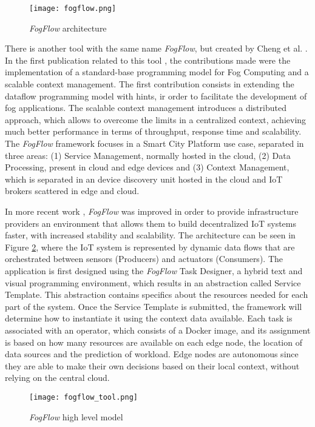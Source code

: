 \begin{figure}[h]
\caption{\textit{FogFlow} architecture \cite{fog_flow}}
\label{fig:fogflow}
\centering
\texttt{[image: fogflow.png]}
\end{figure}

There is another tool with the same name \textit{FogFlow}, but created by Cheng et al. \cite{fogflow_github}. In the first publication related to this tool \cite{fog_flow_easy}, the contributions made were the implementation of a standard-base programming model for Fog Computing and a scalable context management. The first contribution consists in extending the dataflow programming model with hints, ir order to facilitate the development of fog applications. The scalable context management introduces a distributed approach, which allows to overcome the limits in a centralized context, achieving much better performance in terms of throughput, response time and scalability. The \textit{FogFlow} framework focuses in a Smart City Platform use case, separated in three areas: (1) Service Management, normally hosted in the cloud, (2) Data Processing, present in cloud and edge devices and (3) Context Management, which is separated in an device discovery unit hosted in the cloud and IoT brokers scattered in edge and cloud.

In more recent work \cite{fog_flow_tool}, \textit{FogFlow} was improved in order to provide infrastructure providers an environment that allows them to build decentralized IoT systems faster, with increased stability and scalability. The architecture can be seen in Figure \ref{fig:fogflow_tool}, where the IoT system is represented by dynamic data flows that are orchestrated between sensors (Producers) and actuators (Consumers). The application is first designed using the \textit{FogFlow} Task Designer, a hybrid text and visual programming environment, which results in an abstraction called Service Template. This abstraction contains specifics about the resources needed for each part of the system. Once the Service Template is submitted, the framework will determine how to instantiate it using the context data available. Each task is associated with an operator, which consists of a Docker image, and its assignment is based on how many resources are available on each edge node, the location of data sources and the prediction of workload. Edge nodes are autonomous since they are able to make their own decisions based on their local context, without relying on the central cloud.

\begin{figure}[h]
\caption{\textit{FogFlow} high level model \cite{fog_flow_tool}}
\label{fig:fogflow_tool}
\centering
\texttt{[image: fogflow\_tool.png]}
\end{figure}

